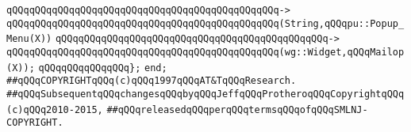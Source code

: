 \verb|qQQqqQQqqQQqqQQqqQQqqQQqqQQqqQQqqQQqqQQqqQQqqQQq->|\newline
\verb|qQQqqQQqqQQqqQQqqQQqqQQqqQQqqQQqqQQqqQQqqQQqqQQq(String,qQQqpu::Popup_Menu(X))|\newline
\verb|qQQqqQQqqQQqqQQqqQQqqQQqqQQqqQQqqQQqqQQqqQQqqQQq->|\newline
\verb|qQQqqQQqqQQqqQQqqQQqqQQqqQQqqQQqqQQqqQQqqQQqqQQq(wg::Widget,qQQqMailop(X));|\newline
\verb|qQQqqQQqqQQqqQQq};|\newline
\verb|end;|\newline
\newline
\verb|##qQQqCOPYRIGHTqQQq(c)qQQq1997qQQqAT&TqQQqResearch.|\newline
\verb|##qQQqSubsequentqQQqchangesqQQqbyqQQqJeffqQQqProtheroqQQqCopyrightqQQq(c)qQQq2010-2015,|\newline
\verb|##qQQqreleasedqQQqperqQQqtermsqQQqofqQQqSMLNJ-COPYRIGHT.|\newline

